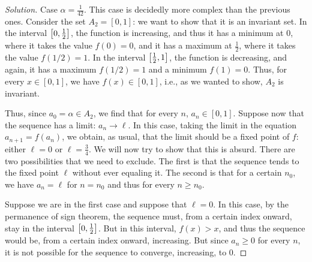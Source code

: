 \begin{proof}[Solution]
  Case $\alpha = \frac 1{42}$. This case is decidedly more complex than
    the previous ones. Consider the set $A_2 = [0, 1]$: we want to show that it
  is an invariant set. In the interval $\left[0,\frac 1 2\right]$, the
  function is
    increasing, and thus it has a minimum at $0$, where it takes the value
  $f(0)=0$, and it has
    a maximum at $\frac 1 2$, where it takes the value $f(1/2) = 1$. In the
  interval
    $\left[\frac 1 2,1\right]$, the function is decreasing, and again, it
  has a maximum $f(1/2)=1$ and
  a minimum $f(1)=0$. Thus, for every $x\in [0,1]$, we have $f(x) \in
  [0,1]$, i.e., as we wanted to show, $A_2$ is invariant.

  Thus, since $a_0 = \alpha \in A_2$, we find that for every $n$,
  $a_n \in [0,1]$. Suppose now that the sequence has
  a limit: $a_n \to \ell$. In this case, taking the limit
  in the equation $a_{n+1} = f(a_n)$, we obtain, as usual, that the
  limit should be a fixed point of $f$: either $\ell=0$ or
    $\ell=\frac 3 4$. We will now try to show that this is absurd. There are two
  possibilities that we need to exclude. The first is that the
  sequence tends to the fixed point $\ell$ without ever equaling it. The
  second is that for a certain $n_0$, we have $a_n = \ell$ for $n=n_0$ and
  thus for every $n\ge n_0$.

  Suppose we are in the first case and suppose that $\ell = 0$. In
    this case, by the permanence of sign theorem, the sequence must, from a
  certain index onward, stay in the interval $\left[0,\frac 1 2\right]$. But
  in this interval, $f(x)>x$, and thus the sequence would be,
  from a certain index onward, increasing. But since $a_n \ge 0$ for
  every $n$, it is not possible for the sequence to converge, increasing, to
  $0$.


\end{proof}
